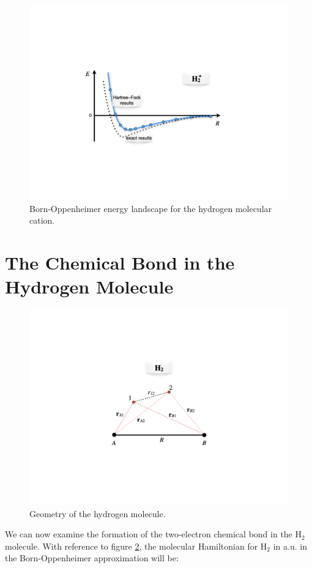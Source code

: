 \documentclass[
  9pt,
]{extbook}
\theoremstyle{definition}
\theoremstyle{definition}
\theoremstyle{definition}
\theoremstyle{remark}
\begin{document}
\begin{figure}

{\centering \includegraphics[width=0.7\linewidth]{./img/OEP_figure3} 

}

\caption{Born-Oppenheimer energy landscape for the hydrogen molecular cation.}\label{fig:Fig3c12}
\end{figure}

\hypertarget{the-chemical-bond-in-the-hydrogen-molecule}{%
\section{The Chemical Bond in the Hydrogen Molecule}\label{the-chemical-bond-in-the-hydrogen-molecule}}

\begin{figure}

{\centering \includegraphics[width=0.7\linewidth]{./img/OEP_figure4} 

}

\caption{Geometry of the hydrogen molecule.}\label{fig:Fig4c12}
\end{figure}

We can now examine the formation of the two-electron chemical bond in the \(\text{H}_2\) molecule. With reference to figure \ref{fig:Fig4c12}, the molecular Hamiltonian for \(\text{H}_2\) in a.u. in the Born-Oppenheimer approximation will be:
\end{document}
